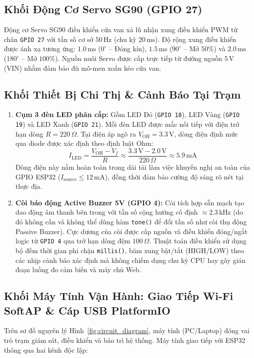 \subsection{Khối Động Cơ Servo SG90 (GPIO 27)}
Động cơ Servo SG90 điều khiển cửa van xả lũ nhận xung điều khiển PWM từ chân \texttt{GPIO 27} với tần số cơ sở $50\,\text{Hz}$ (chu kỳ $20\,\text{ms}$). Độ rộng xung điều khiển được ánh xạ tương ứng: $1.0\,\text{ms}$ ($0^\circ$ -- Đóng kín), $1.5\,\text{ms}$ ($90^\circ$ -- Mở $50\%$) và $2.0\,\text{ms}$ ($180^\circ$ -- Mở $100\%$). Nguồn nuôi Servo được cấp trực tiếp từ đường nguồn $5\,\text{V}$ (VIN) nhằm đảm bảo đủ mô-men xoắn kéo cửa van.

\subsection{Khối Thiết Bị Chỉ Thị \& Cảnh Báo Tại Trạm}
\begin{enumerate}
    \item \textbf{Cụm 3 đèn LED phân cấp:} Gồm LED Đỏ (\texttt{GPIO 18}), LED Vàng (\texttt{GPIO 19}) và LED Xanh (\texttt{GPIO 21}). Mỗi đèn LED được mắc nối tiếp với điện trở hạn dòng $R = 220\,\Omega$. Tại điện áp ngõ ra $V_{\text{OH}} = 3.3\,\text{V}$, dòng điện định mức qua diode được xác định theo định luật Ohm:
    \begin{equation}
        I_{\text{LED}} = \frac{V_{\text{OH}} - V_f}{R} \approx \frac{3.3\,\text{V} - 2.0\,\text{V}}{220\,\Omega} \approx 5.9\,\text{mA}
    \end{equation}
    Dòng điện này nằm hoàn toàn trong dải tải làm việc khuyến nghị an toàn của GPIO ESP32 ($I_{\text{source}} \le 12\,\text{mA}$), đồng thời đảm bảo cường độ sáng rõ nét tại thực địa.
    \item \textbf{Còi báo động Active Buzzer 5V (GPIO 4):} Còi tích hợp sẵn mạch tạo dao động âm thanh bên trong với tần số cộng hưởng cố định $\approx 2.3\,\text{kHz}$ (do đó không cần và không thể dùng hàm \texttt{tone()} để đổi tần số như còi thụ động Passive Buzzer). Cực dương của còi được cấp nguồn và điều khiển đóng/ngắt logic từ \texttt{GPIO 4} qua trở hạn dòng đệm $100\,\Omega$. Thuật toán điều khiển sử dụng bộ đếm thời gian phi chặn \texttt{millis()}, băm xung bật/tắt (HIGH/LOW) theo các nhịp cảnh báo xác định mà không chiếm dụng chu kỳ CPU hay gây gián đoạn luồng đo cảm biến và máy chủ Web.
\end{enumerate}

\subsection{Khối Máy Tính Vận Hành: Giao Tiếp Wi-Fi SoftAP \& Cáp USB PlatformIO}
\label{subsec:pc_interface}
Trên sơ đồ nguyên lý Hình~\ref{fig:circuit_diagram}, máy tính (PC/Laptop) đóng vai trò trạm giám sát, điều khiển và bảo trì hệ thống. Máy tính giao tiếp với ESP32 thông qua hai kênh độc lập:

